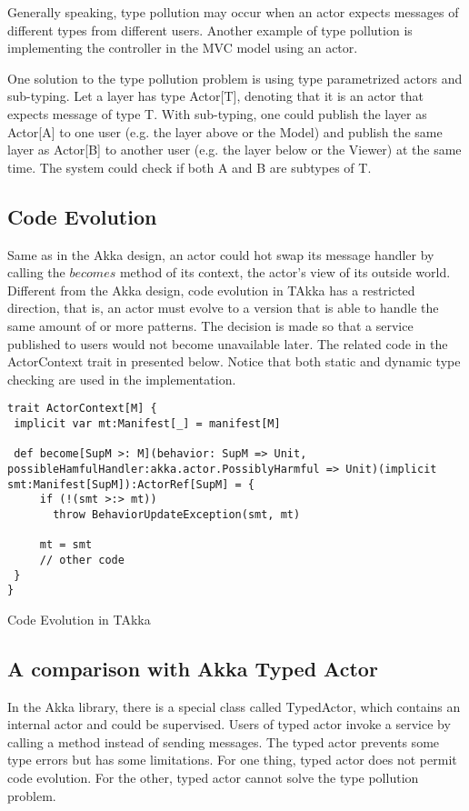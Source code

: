Generally speaking, type pollution may occur when an actor expects messages of different types from different users.  Another example of type pollution is implementing the controller in the MVC model using an actor.

One solution to the type pollution problem is using type parametrized actors and sub-typing.  Let a layer has type Actor[T], denoting that it is an actor that expects message of type T.  With sub-typing, one could publish the layer as Actor[A] to one user (e.g. the layer above or the Model) and  publish the same layer as Actor[B] to another user (e.g. the layer below or the Viewer) at the same time. The system could check if both A and B are subtypes of T.

\subsection{Code Evolution}
Same as in the Akka design, an actor could hot swap its message handler by calling the $becomes$ method of its context, the actor\rq{}s view of its outside world.  Different from the Akka design, code evolution in TAkka has a restricted direction, that is, an actor must evolve to a version that is able to handle the same amount of or more patterns.  The decision is made so that a service published to users would not become unavailable later.  The related code in the ActorContext trait in presented below.  Notice that both static and dynamic type checking are used in the implementation.

\begin{table}[h]
\begin{lstlisting}
trait ActorContext[M] {
 implicit var mt:Manifest[_] = manifest[M]

 def become[SupM >: M](behavior: SupM => Unit, possibleHamfulHandler:akka.actor.PossiblyHarmful => Unit)(implicit smt:Manifest[SupM]):ActorRef[SupM] = {
     if (!(smt >:> mt))
       throw BehaviorUpdateException(smt, mt)
     
     mt = smt
     // other code
 }
}
\end{lstlisting}
\caption{Code Evolution in TAkka}
\end{table}

\subsection{A comparison with Akka Typed Actor}
In the Akka library, there is a special class called TypedActor, which contains an internal actor and could be supervised.  Users of typed actor invoke a service by calling a method instead of sending messages.  The typed actor prevents some type errors but has some limitations.  For one thing, typed actor does not permit code evolution.  For the other, typed actor cannot solve the type pollution problem.


